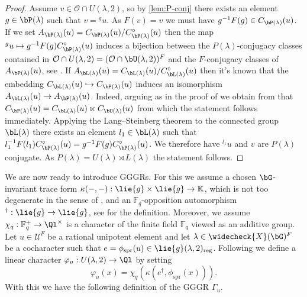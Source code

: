 \documentclass[eqthmnum, nocolour]{jt-calcs}
\begin{document}
\begin{proof}
Assume $v \in \mathcal{O}\cap U(\lambda,2)$, so by \cref{lem:P-conj} there exists an element $g \in \bP(\lambda)$ such that $v = {}^gu$. As $F(v) = v$ we must have $g^{-1}F(g) \in C_{\bP(\lambda)}(u)$. If we set $A_{\bP(\lambda)}(u) = C_{\bP(\lambda)}(u)/C_{\bP(\lambda)}^{\circ}(u)$ then the map ${}^gu \mapsto g^{-1}F(g)C_{\bP(\lambda)}^{\circ}(u)$ induces a bijection between the $P(\lambda)$-conjugacy classes contained in $\mathcal{O}\cap U(\lambda,2) = (\mathcal{O} \cap \bU(\lambda,2))^F$ and the $F$-conjugacy classes of $A_{\bP(\lambda)}(u)$, see \cite[4.3.5]{geck:2003:intro-to-algebraic-geometry}. If $A_{\bL(\lambda)}(u) = C_{\bL(\lambda)}(u)/C_{\bL(\lambda)}^{\circ}(u)$ then it's known that the embedding $C_{\bL(\lambda)}(u) \hookrightarrow C_{\bP(\lambda)}(u)$ induces an isomorphism $A_{\bL(\lambda)}(u) \to A_{\bP(\lambda)}(u)$. Indeed, arguing as in the proof of \cite[3.22]{taylor:2016:GGGRs-small-characteristics} we obtain from \cite[2.3]{premet:2003:nilpotent-orbits-in-good-characteristic} that $C_{\bP(\lambda)}(u) = C_{\bL(\lambda)}(u) \ltimes C_{\bU(\lambda)}(u)$ from which the statement follows immediately. Applying the Lang--Steinberg theorem to the connected group $\bL(\lambda)$ there exists an element $l_1 \in \bL(\lambda)$ such that $l_1^{-1}F(l_1)C_{\bP(\lambda)}^{\circ}(u) = g^{-1}F(g)C_{\bP(\lambda)}^{\circ}(u)$. We therefore have ${}^{l_1}u$ and $v$ are $P(\lambda)$ conjugate. As $P(\lambda) = U(\lambda) \rtimes L(\lambda)$ the statement follows.
\end{proof}

\begin{pa}\label{pa:GGGR-intro}
We are now ready to introduce GGGRs. For this we assume a chosen $\bG$-invariant trace form $\kappa(-,-) : \lie{g} \times \lie{g} \to \mathbb{K}$, which is not too degenerate in the sense of \cite[5.6]{taylor:2016:GGGRs-small-characteristics}, and an $\mathbb{F}_q$-opposition automorphism ${}^{\dag} : \lie{g} \to \lie{g}$, see \cite[5.1]{taylor:2016:GGGRs-small-characteristics} for the definition. Moreover, we assume $\chi_q : \mathbb{F}_q^+ \to \Ql^{\times}$ is a character of the finite field $\mathbb{F}_q$ viewed as an additive group. Let $u \in \mathcal{U}^F$ be a rational unipotent element and let $\lambda \in \widecheck{X}(\bG)^F$ be a cocharacter such that $e = \phi_{\mathrm{spr}}(u) \in \lie{g}(\lambda,2)_{\mathrm{reg}}$. Following \cite[5.10]{taylor:2016:GGGRs-small-characteristics} we define a linear character $\varphi_u : U(\lambda,2) \to \Ql$ by setting
\begin{equation*}
\varphi_u(x) = \chi_q(\kappa(e^{\dag},\phi_{\mathrm{spr}}(x))).
\end{equation*}
With this we have the following definition of the GGGR $\Gamma_u$.
\end{pa}
\end{document}
